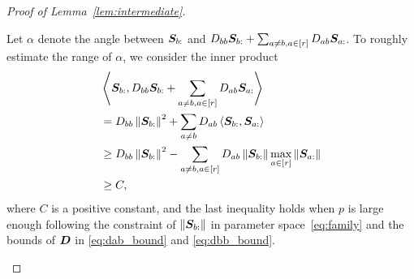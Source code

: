 \documentclass[journal]{IEEEtran}
\theoremstyle{definition}
\theoremstyle{definition}
\newcommand{\ang}[1]{\left\langle#1\right\rangle}
\begin{document}
\begin{proof}[Proof of Lemma~\ref{lem:intermediate}]
\begin{enumerate}[wide]
    Let $\alpha$ denote the angle between $\bm S_{b:}$ and $D_{bb} \bm S_{b:} + \sum_{a \neq b, a \in [r]} D_{ab} \bm S_{a:}$. To roughly estimate the range of $\alpha$, we consider the inner product 
    \begin{align}
        &\ang{\mS_{b:},  D_{bb} \mS_{b:} + \sum_{a \neq b, a \in [r]} D_{ab} \mS_{a:}} \\  &= D_{bb} \onorm{\mS_{b:}}^2 + \sum_{a \neq b} D_{ab}\ang{\mS_{b:}, \mS_{a:}}\\
        &\geq D_{bb} \onorm{\mS_{b:}}^2 -  \sum_{a \neq b, a \in [r]} D_{ab}   \onorm{\mS_{b:}} \max_{a \in [r]}  \onorm{\mS_{a:}} \\
        & \geq C,
    \end{align}
    where $C$ is a positive constant, and the last inequality holds when $p$ is large enough following the constraint of $\left\lVert\bm S_{b:}\right\rVert$ in parameter space~\eqref{eq:family} and the bounds of $\bm{D}$ in \eqref{eq:dab_bound} and \eqref{eq:dbb_bound}.
    

\end{enumerate}
\end{proof}
\end{document}
